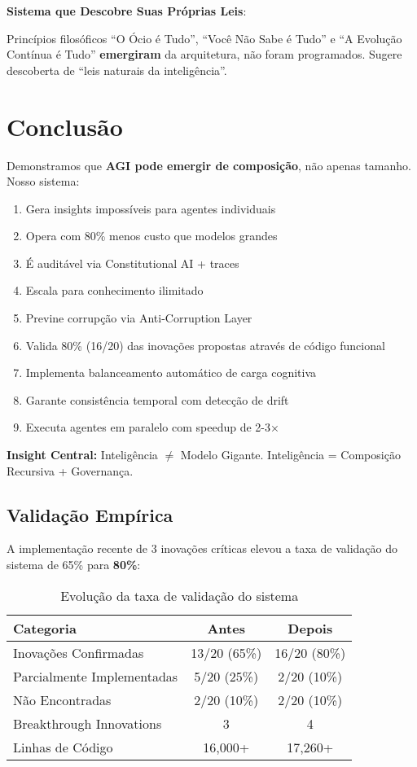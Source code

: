 \documentclass[11pt]{article}
\begin{document}
\textbf{Sistema que Descobre Suas Próprias Leis}:

Princípios filosóficos ``O Ócio é Tudo'', ``Você Não Sabe é Tudo'' e ``A Evolução Contínua é Tudo'' \textbf{emergiram} da arquitetura, não foram programados. Sugere descoberta de ``leis naturais da inteligência''.

\section{Conclusão}

Demonstramos que \textbf{AGI pode emergir de composição}, não apenas tamanho. Nosso sistema:

\begin{enumerate}
    \item Gera insights impossíveis para agentes individuais
    \item Opera com 80\% menos custo que modelos grandes
    \item É auditável via Constitutional AI + traces
    \item Escala para conhecimento ilimitado
    \item Previne corrupção via Anti-Corruption Layer
    \item Valida 80\% (16/20) das inovações propostas através de código funcional
    \item Implementa balanceamento automático de carga cognitiva
    \item Garante consistência temporal com detecção de drift
    \item Executa agentes em paralelo com speedup de 2-3×
\end{enumerate}

\textbf{Insight Central:} Inteligência $\neq$ Modelo Gigante. Inteligência = Composição Recursiva + Governança.

\subsection{Validação Empírica}

A implementação recente de 3 inovações críticas elevou a taxa de validação do sistema de 65\% para \textbf{80\%}:

\begin{table}[H]
\centering
\begin{tabular}{@{}lcc@{}}
\toprule
\textbf{Categoria} & \textbf{Antes} & \textbf{Depois} \\ \midrule
Inovações Confirmadas & 13/20 (65\%) & 16/20 (80\%) \\
Parcialmente Implementadas & 5/20 (25\%) & 2/20 (10\%) \\
Não Encontradas & 2/20 (10\%) & 2/20 (10\%) \\
Breakthrough Innovations & 3 & 4 \\
Linhas de Código & 16,000+ & 17,260+ \\ \bottomrule
\end{tabular}
\caption{Evolução da taxa de validação do sistema}
\end{table}
\end{document}
